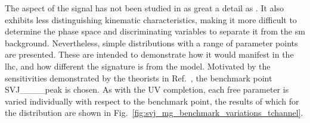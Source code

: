 The \tchannel aspect of the signal has not been studied in as great a detail as \schannel. It also exhibits less distinguishing kinematic characteristics, making it more difficult to determine the phase space and discriminating variables to separate it from the \acrlong{sm} background. Nevertheless, simple distributions with a range of parameter points are presented. These are intended to demonstrate how it would manifest in the \acrshort{lhc}, and how different the signature is from the \schannel model. Motivated by the sensitivities demonstrated by the theorists in Ref.~, the benchmark point SVJ\_\_\_\_\-peak is chosen. As with the \schannel UV completion, each free parameter is varied individually with respect to the benchmark point, the results of which for the \mT distribution are shown in Fig.~\ref{fig:svj_mg_benchmark_variations_tchannel}.

